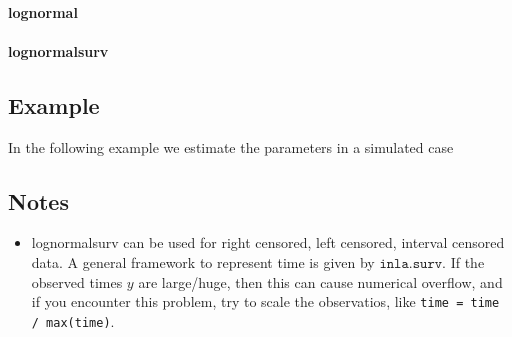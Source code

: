 \documentclass[a4paper,11pt]{article}
\begin{document}
\paragraph{lognormal}
\begin{quote}
    
\end{quote}
\paragraph{lognormalsurv}
\begin{quote}
    
\end{quote}

\subsection*{Example}

In the following example we estimate the parameters in a simulated
case 

\subsection*{Notes}

\begin{itemize}
\item lognormalsurv can be used for right censored, left censored,
    interval censored data. A general framework to represent time is
    given by $\texttt{inla.surv}$. If the observed times $y$ are
    large/huge, then this can cause numerical overflow, and if you
    encounter this problem, try to scale the observatios, like
    \verb|time = time / max(time)|.
\end{itemize}
\end{document}
